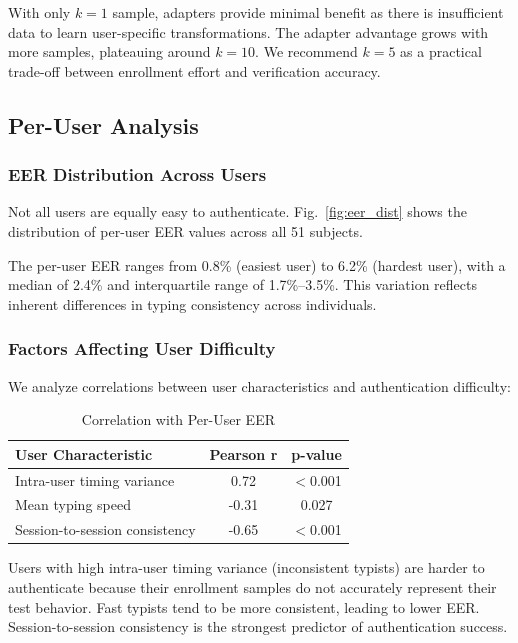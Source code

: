 \documentclass{ieeeaccess}
\begin{document}
{With only $k=1$ sample, adapters provide minimal benefit as there is insufficient data to learn user-specific transformations. The adapter advantage grows with more samples, plateauing around $k=10$. We recommend $k=5$ as a practical trade-off between enrollment effort and verification accuracy.

\subsection{Per-User Analysis}

\subsubsection{EER Distribution Across Users}
Not all users are equally easy to authenticate. Fig.~\ref{fig:eer_dist} shows the distribution of per-user EER values across all 51 subjects.

The per-user EER ranges from 0.8\% (easiest user) to 6.2\% (hardest user), with a median of 2.4\% and interquartile range of 1.7\%--3.5\%. This variation reflects inherent differences in typing consistency across individuals.

\subsubsection{Factors Affecting User Difficulty}
We analyze correlations between user characteristics and authentication difficulty:

\begin{table}[h]
\caption{Correlation with Per-User EER}
\label{tab:user_factors}
\centering
\begin{tabular}{|l|c|c|}
\hline
\textbf{User Characteristic} & \textbf{Pearson r} & \textbf{p-value} \\
\hline
Intra-user timing variance & 0.72 & $<$0.001 \\
Mean typing speed & -0.31 & 0.027 \\
Session-to-session consistency & -0.65 & $<$0.001 \\
\hline
\end{tabular}
\end{table}

Users with high intra-user timing variance (inconsistent typists) are harder to authenticate because their enrollment samples do not accurately represent their test behavior. Fast typists tend to be more consistent, leading to lower EER. Session-to-session consistency is the strongest predictor of authentication success.

}
\end{document}
